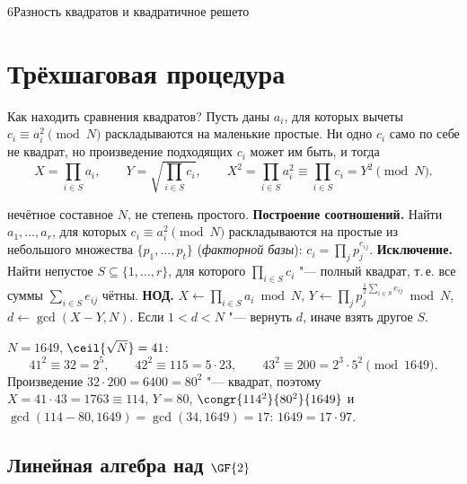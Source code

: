 \begin{lecture}{6}{Разность квадратов и квадратичное решето}

\section{Трёхшаговая процедура}

Как находить сравнения квадратов? Пусть даны $a_i$, для которых вычеты
$c_i \equiv a_i^2 \pmod N$ раскладываются на маленькие простые. Ни одно $c_i$ само по себе не
квадрат, но произведение подходящих $c_i$ может им быть, и тогда
\[
  X = \prod_{i \in S} a_i, \qquad Y = \sqrt{\prod_{i \in S} c_i}, \qquad
  X^2 = \prod_{i \in S} a_i^2 \equiv \prod_{i \in S} c_i = Y^2 \pmod N.
\]

\begin{algorithm}
\begin{algorithmic}[1]
\Require нечётное составное $N$, не степень простого.
\State \textbf{Построение соотношений.} Найти $a_1, \dots, a_r$, для которых
  $c_i \equiv a_i^2 \pmod N$ раскладываются на простые из небольшого множества
  $\{p_1, \dots, p_t\}$ (\emph{факторной базы}): $c_i = \prod_j p_j^{e_{ij}}$.
\State \textbf{Исключение.} Найти непустое $S \subseteq \{1, \dots, r\}$, для которого
  $\prod_{i \in S} c_i$ "--- полный квадрат, т.\,е. все суммы $\sum_{i \in S} e_{ij}$ чётны.
\State \textbf{НОД.} $X \gets \prod_{i \in S} a_i \bmod N$,
  $Y \gets \prod_j p_j^{\frac12\sum_{i \in S} e_{ij}} \bmod N$, $d \gets \gcd(X - Y, N)$.
  Если $1 < d < N$ "--- вернуть $d$, иначе взять другое $S$.
\end{algorithmic}
\end{algorithm}

\begin{example}\label{l6:ex-1649}
$N = 1649$, $\ceil{\sqrt N} = 41$:
\[
  41^2 \equiv 32 = 2^5, \qquad 42^2 \equiv 115 = 5 \cdot 23, \qquad 43^2 \equiv 200 = 2^3 \cdot 5^2
  \pmod{1649}.
\]
Произведение $32 \cdot 200 = 6400 = 80^2$ "--- квадрат, поэтому $X = 41 \cdot 43 = 1763 \equiv 114$,
$Y = 80$, $\congr{114^2}{80^2}{1649}$ и $\gcd(114 - 80, 1649) = \gcd(34, 1649) = 17$:
$1649 = 17 \cdot 97$.
\end{example}

\subsection{Линейная алгебра над $\GF{2}$}


\end{lecture}
